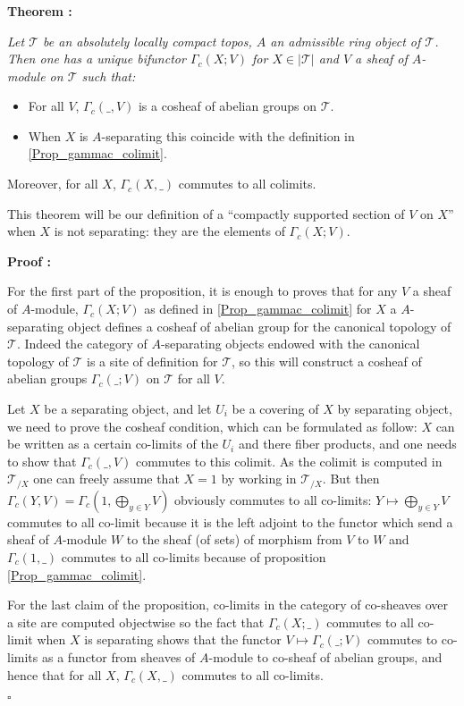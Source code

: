 \documentclass[a4paper]{article}
\newcommand{\Tcal}{\mathcal{T}}
\newcommand{\block}[1]
{

\par \subsubsection{} #1

\bigskip}
\newcommand{\Th}[1]
	{
	\bigskip	
	\textbf{Theorem : }{\itshape #1}
		
	\bigskip
	}
\newcommand{\Dem}[1]{
	
	\smallskip
	
	\textbf{Proof : } \par
	 {#1} $\square$
	 
	 \bigskip
}
\begin{document}
\block{\label{Th_def_cptsection}\Th{Let $\Tcal$ be an absolutely locally compact topos, $A$ an admissible ring object of $\Tcal$. Then one has a unique bifunctor $\Gamma_c(X;V)$ for $X \in |\Tcal|$ and $V$ a sheaf of $A$-module on $\Tcal$ such that:

\begin{itemize}

\item For all $V$, $\Gamma_c(\_ ,V)$ is a cosheaf of abelian groups on $\Tcal$.

\item When $X$ is $A$-separating this coincide with the definition in \ref{Prop_gammac_colimit}.

\end{itemize}

Moreover, for all $X$, $\Gamma_c(X,\_)$ commutes to all colimits.


}

This theorem will be our definition of a ``compactly supported section of $V$ on $X$'' when $X$ is not separating: they are the elements of $\Gamma_c(X;V)$.

\Dem{For the first part of the proposition, it is enough to proves that for any $V$ a sheaf of $A$-module, $\Gamma_c(X;V)$ as defined in \ref{Prop_gammac_colimit} for $X$ a $A$-separating object defines a cosheaf of abelian group for the canonical topology of $\Tcal$. Indeed the category of $A$-separating objects endowed with the canonical topology of $\Tcal$ is a site of definition for $\Tcal$, so this will construct a cosheaf of abelian groups $\Gamma_c( \_ ;V )$ on $\Tcal$ for all $V$.

Let $X$ be a separating object, and let $U_i$ be a covering of $X$ by separating object, we need to prove the cosheaf condition, which can be formulated as follow: $X$ can be written as a certain co-limits of the $U_i$ and there fiber products, and one needs to show that $\Gamma_c(\_,V)$ commutes to this colimit. As the colimit is computed in $\Tcal_{/X}$ one can freely assume that $X=1$ by working in $\Tcal_{/X}$. But then $\Gamma_c(Y,V) = \Gamma_c(1, \bigoplus_{y \in Y} V)$ obviously commutes to all co-limits: $Y \mapsto \bigoplus_{y \in Y} V$ commutes to all co-limit because it is the left adjoint to the functor which send a sheaf of $A$-module $W$ to the sheaf (of sets) of morphism from $V$ to $W$ and $\Gamma_c(1,\_)$ commutes to all co-limits because of proposition \ref{Prop_gammac_colimit}.


For the last claim of the proposition, co-limits in the category of co-sheaves over a site are computed objectwise so the fact that $\Gamma_c(X; \_)$ commutes to all co-limit when $X$ is separating shows that the functor $V \mapsto \Gamma_c( \_;V)$ commutes to co-limits as a functor from sheaves of $A$-module to co-sheaf of abelian groups, and hence that for all $X$, $\Gamma_c(X,\_)$ commutes to all co-limits.
}
}
\end{document}
